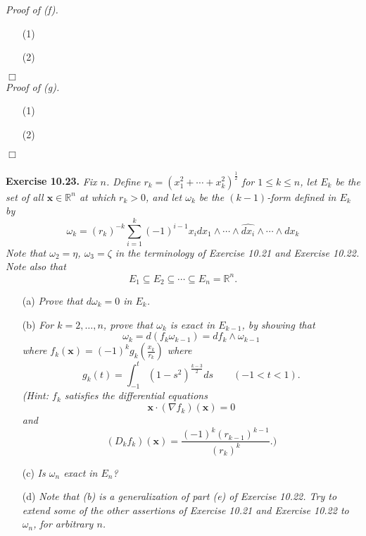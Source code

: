 \documentclass{article}
\begin{document}
\emph{Proof of (f).}
\begin{enumerate}
\item[(1)]
\item[(2)]

\end{enumerate}
$\Box$ \\



\emph{Proof of (g).}
\begin{enumerate}
\item[(1)]
\item[(2)]

\end{enumerate}
$\Box$ \\\\






\textbf{Exercise 10.23.}
\emph{Fix $n$.
Define $r_k = (x_1^2+\cdots+x_k^2)^{\frac{1}{2}}$ for $1 \leq k \leq n$,
let $E_k$ be the set of all $\mathbf{x} \in \mathbb{R}^n$ at which $r_k > 0$,
and let $\omega_k$ be the $(k-1)$-form defined in $E_k$ by
\[
  \omega_k
  = (r_k)^{-k}
    \sum_{i=1}^{k} (-1)^{i-1} x_i dx_1 \wedge \cdots
    \wedge \widehat{dx_i} \wedge \cdots \wedge dx_k
\]
Note that $\omega_2 = \eta$, $\omega_3 = \zeta$ in the terminology of
Exercise 10.21 and Exercise 10.22.
Note also that}
\[
  E_1 \subseteq E_2 \subseteq \cdots \subseteq E_n = \mathbb{R}^n.
\]
\begin{enumerate}
\item[(a)]
  \emph{Prove that $d\omega_k = 0$ in $E_k$.}

\item[(b)]
  \emph{For $k=2,\ldots,n$, prove that $\omega_k$ is exact in $E_{k-1}$,
  by showing that
  \[
    \omega_k = d(f_k\omega_{k-1}) = df_k \wedge \omega_{k-1}
  \]
  where $f_k(\mathbf{x}) = (-1)^k g_k\left( \frac{x_k}{r_k} \right)$
  where
  \[
    g_k(t) = \int_{-1}^{t} (1-s^2)^{\frac{k-3}{2}} ds
    \qquad
    (-1 < t < 1).
  \]
  (Hint: $f_k$ satisfies the differential equations
  \[
    \mathbf{x} \cdot (\nabla f_k)(\mathbf{x}) = 0
  \]
  and
  \[
    (D_k f_k)(\mathbf{x}) = \frac{(-1)^k(r_{k-1})^{k-1}}{(r_k)^k}.)
  \]}

\item[(c)]
  \emph{Is $\omega_n$ exact in $E_n$?}

\item[(d)]
  \emph{Note that (b) is a generalization of part (e) of Exercise 10.22.
  Try to extend some of the other assertions of Exercise 10.21 and Exercise 10.22
  to $\omega_n$, for arbitrary $n$.} \\
\end{enumerate}
\end{document}
